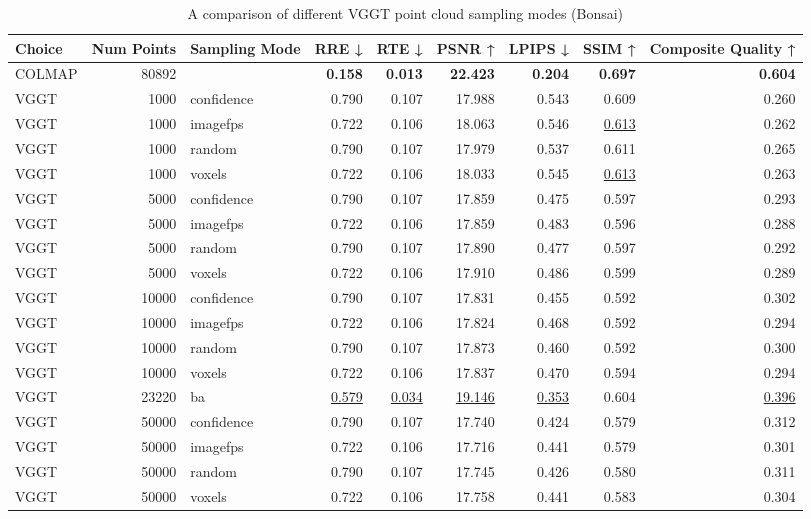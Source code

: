 \begin{table}[H]
\caption{\ifdefined\customcaption \customcaption \else A comparison of different VGGT point cloud sampling modes (Bonsai) \fi}
\label{tab:03_sampling_mode_bonsai}
\centering
\scriptsize
\begin{tabular}{lrlrrrrrr}
\toprule
Choice & Num Points & Sampling Mode & RRE ↓ & RTE ↓ & PSNR ↑ & LPIPS ↓ & SSIM ↑ & Composite Quality ↑ \\
\midrule
COLMAP & 80892 &  & \textbf{0.158} & \textbf{0.013} & \textbf{22.423} & \textbf{0.204} & \textbf{0.697} & \textbf{0.604} \\
VGGT & 1000 & confidence & 0.790 & 0.107 & 17.988 & 0.543 & 0.609 & 0.260 \\
VGGT & 1000 & imagefps & 0.722 & 0.106 & 18.063 & 0.546 & \underline{0.613} & 0.262 \\
VGGT & 1000 & random & 0.790 & 0.107 & 17.979 & 0.537 & 0.611 & 0.265 \\
VGGT & 1000 & voxels & 0.722 & 0.106 & 18.033 & 0.545 & \underline{0.613} & 0.263 \\
VGGT & 5000 & confidence & 0.790 & 0.107 & 17.859 & 0.475 & 0.597 & 0.293 \\
VGGT & 5000 & imagefps & 0.722 & 0.106 & 17.859 & 0.483 & 0.596 & 0.288 \\
VGGT & 5000 & random & 0.790 & 0.107 & 17.890 & 0.477 & 0.597 & 0.292 \\
VGGT & 5000 & voxels & 0.722 & 0.106 & 17.910 & 0.486 & 0.599 & 0.289 \\
VGGT & 10000 & confidence & 0.790 & 0.107 & 17.831 & 0.455 & 0.592 & 0.302 \\
VGGT & 10000 & imagefps & 0.722 & 0.106 & 17.824 & 0.468 & 0.592 & 0.294 \\
VGGT & 10000 & random & 0.790 & 0.107 & 17.873 & 0.460 & 0.592 & 0.300 \\
VGGT & 10000 & voxels & 0.722 & 0.106 & 17.837 & 0.470 & 0.594 & 0.294 \\
VGGT & 23220 & ba & \underline{0.579} & \underline{0.034} & \underline{19.146} & \underline{0.353} & 0.604 & \underline{0.396} \\
VGGT & 50000 & confidence & 0.790 & 0.107 & 17.740 & 0.424 & 0.579 & 0.312 \\
VGGT & 50000 & imagefps & 0.722 & 0.106 & 17.716 & 0.441 & 0.579 & 0.301 \\
VGGT & 50000 & random & 0.790 & 0.107 & 17.745 & 0.426 & 0.580 & 0.311 \\
VGGT & 50000 & voxels & 0.722 & 0.106 & 17.758 & 0.441 & 0.583 & 0.304 \\

\end{tabular}
\end{table}
